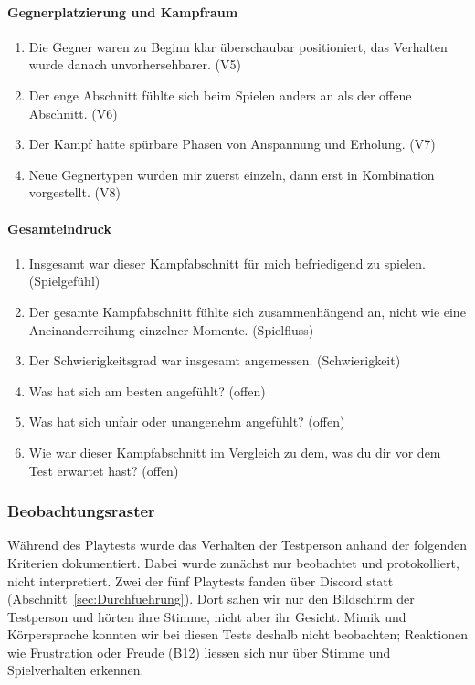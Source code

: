 \documentclass[../Main.tex]{subfiles}
\begin{document}
\paragraph{Gegnerplatzierung und Kampfraum}
\begin{enumerate}[label=\textbf{Q\arabic*}, leftmargin=1.5cm, itemsep=0.5em, resume]
    \item Die Gegner waren zu Beginn klar überschaubar positioniert, das Verhalten wurde danach unvorhersehbarer. \hfill (V5)
    \item Der enge Abschnitt fühlte sich beim Spielen anders an als der offene Abschnitt. \hfill (V6)
    \item Der Kampf hatte spürbare Phasen von Anspannung und Erholung. \hfill (V7)
    \item Neue Gegnertypen wurden mir zuerst einzeln, dann erst in Kombination vorgestellt. \hfill (V8)
\end{enumerate}

\paragraph{Gesamteindruck}
\begin{enumerate}[label=\textbf{Q\arabic*}, leftmargin=1.5cm, itemsep=0.5em, resume]
    \item Insgesamt war dieser Kampfabschnitt für mich befriedigend zu spielen. \hfill (Spielgefühl)
    \item Der gesamte Kampfabschnitt fühlte sich zusammenhängend an, nicht wie eine Aneinanderreihung einzelner Momente. \hfill (Spielfluss)
    \item Der Schwierigkeitsgrad war insgesamt angemessen. \hfill (Schwierigkeit)
    \item Was hat sich am besten angefühlt? \hfill (offen)
    \item Was hat sich unfair oder unangenehm angefühlt? \hfill (offen)
    \item Wie war dieser Kampfabschnitt im Vergleich zu dem, was du dir vor dem Test erwartet hast? \hfill (offen)
\end{enumerate}

\subsubsection{Beobachtungsraster} \label{sec:Beobachtungsraster}

Während des Playtests wurde das Verhalten der Testperson anhand der folgenden Kriterien dokumentiert. Dabei wurde zunächst nur beobachtet und protokolliert, nicht interpretiert. Zwei der fünf Playtests fanden über Discord statt (Abschnitt~\ref{sec:Durchfuehrung}). Dort sahen wir nur den Bildschirm der Testperson und hörten ihre Stimme, nicht aber ihr Gesicht. Mimik und Körpersprache konnten wir bei diesen Tests deshalb nicht beobachten; Reaktionen wie Frustration oder Freude (B12) liessen sich nur über Stimme und Spielverhalten erkennen.
\end{document}
